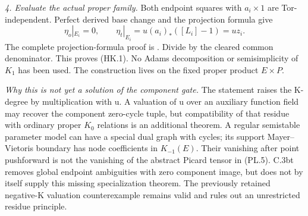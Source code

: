\emph{4. Evaluate the actual proper family.}
Both endpoint squares with $a_i\times1$ are Tor-independent.
Perfect derived base change and the projection formula give
\[
 \eta_o|_{E_i}=0,\qquad
 \eta_t|_{E_i}=u(a_i)_*([L_i]-1)=u z_i.
\]
The complete projection-formula proof is
\citet[Proposition 3.17, pp.~320--321]{D_ThomasonTrobaugh1990}.
Divide by the cleared common denominator. This proves (HK.1).
No Adams decomposition or semisimplicity of $K_1$ has been used.
The construction lives on the fixed proper product $E\times P$.

\emph{Why this is not yet a solution of the component gate.}
The statement raises the K-degree by multiplication with u. A
valuation of u over an auxiliary function field may recover the
component zero-cycle tuple, but compatibility of that residue with
ordinary proper $K_0$ relations is an additional theorem. A regular
semistable parameter model can have a special dual graph with cycles;
its support Mayer--Vietoris boundary has node coefficients in
$K_{-1}(E)$. Their vanishing after point pushforward is not the
vanishing of the abstract Picard tensor in (PL.5).
C.3bt removes global endpoint ambiguities with zero component image,
but does not by itself supply this missing specialization theorem.
The previously retained negative-K valuation counterexample remains
valid and rules out an unrestricted residue principle.
